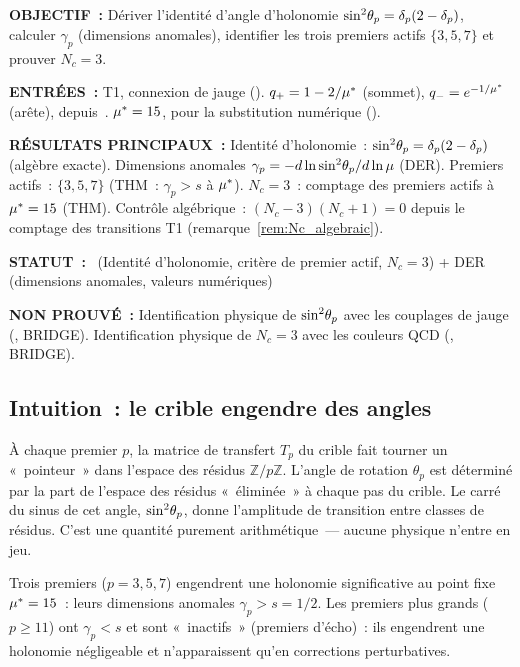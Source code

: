 \documentclass[12pt,a4paper]{article}
\begin{document}
\begin{statusbox}
\textbf{OBJECTIF~:}
  Dériver l'identité d'angle d'holonomie
  $\sin^2\!\theta_{p} = \delta_p(2-\delta_p)$, calculer $\gamma_p$ (dimensions
  anomales), identifier les trois premiers actifs $\{3,5,7\}$ et
  prouver $N_c = 3$.

\textbf{ENTRÉES~:}
  T1, connexion de jauge (\cite{companion_M1}).
  $q_{+} = 1 - 2/{\mu^{*}}$ (sommet), $q_{-} = e^{-1/{\mu^{*}}}$
  (arête), depuis~\cite{companion_M1}.
  ${\mu^{*}} = 15$, pour la substitution numérique
  (\cite{companion_M3}).

\textbf{RÉSULTATS PRINCIPAUX~:}
  Identité d'holonomie~: $\sin^2\!\theta_{p} = \delta_p(2-\delta_p)$ (algèbre
  exacte).
  Dimensions anomales $\gamma_p = -d\ln\sin^2\!\theta_{p}/d\ln\mu$ (DER).
  Premiers actifs~: $\{3,5,7\}$ (THM~: $\gamma_p > s$ à ${\mu^{*}}$).
  $N_c = 3$~: comptage des premiers actifs à ${\mu^{*}} = 15$ (THM).
  Contrôle algébrique~: $(N_c - 3)(N_c + 1) = 0$ depuis le comptage
  des transitions T1 (remarque~\ref{rem:Nc_algebraic}).

\textbf{STATUT~:}
  \THMTAG~(Identité d'holonomie, critère de premier actif, $N_c = 3$)
  + DER (dimensions anomales, valeurs numériques)

\textbf{NON PROUVÉ~:}
  Identification physique de $\sin^2\!\theta_{p}$ avec les couplages de jauge
  (\cite{companion_M5}, BRIDGE).
  Identification physique de $N_c = 3$ avec les couleurs QCD
  (\cite{companion_M5}, BRIDGE).
\end{statusbox}

\subsection{Intuition~: le crible engendre des angles}
\label{sec:ch6_intuition}

À chaque premier $p$, la matrice de transfert $T_p$ du crible fait
tourner un «~pointeur~» dans l'espace des résidus $\mathbb{Z}/p\mathbb{Z}$.
L'angle de rotation $\theta_p$ est déterminé par la part de l'espace
des résidus «~éliminée~» à chaque pas du crible. Le carré du sinus de
cet angle, $\sin^2\!\theta_{p}$, donne l'amplitude de transition entre classes
de résidus. C'est une quantité purement arithmétique~--- aucune
physique n'entre en jeu.

Trois premiers ($p = 3, 5, 7$) engendrent une holonomie significative
au point fixe ${\mu^{*}} = 15$~: leurs dimensions anomales
$\gamma_p > s = 1/2$. Les premiers plus grands ($p \geq 11$) ont
$\gamma_p < s$ et sont «~inactifs~» (premiers d'écho)~: ils
engendrent une holonomie négligeable et n'apparaissent qu'en
corrections perturbatives.
\end{document}

